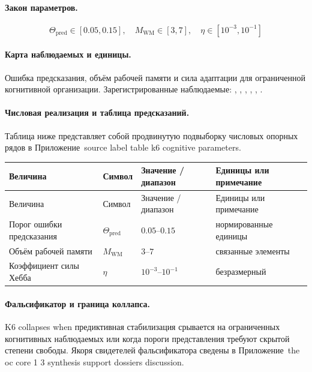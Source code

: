 \paragraph{Закон параметров.}
\[
\Theta_{\mathrm{pred}} \in [0.05,0.15],\quad M_{\mathrm{WM}} \in [3,7],\quad \eta \in [10^{-3},10^{-1}]
\]

\paragraph{Карта наблюдаемых и единицы.}
Ошибка предсказания, объём рабочей памяти и сила адаптации для ограниченной когнитивной организации.
Зарегистрированные наблюдаемые: , \allowbreak {}, \allowbreak {}, \allowbreak {}, \allowbreak {}, \allowbreak {}.

\paragraph{Числовая реализация и таблица предсказаний.}
Таблица ниже представляет собой продвинутую подвыборку числовых опорных рядов в Приложение~source label table k6 cognitive parameters.
\begin{longtable}{@{}L{0.27\textwidth}L{0.15\textwidth}L{0.24\textwidth}L{0.16\textwidth}@{}}
\toprule
Величина & Символ & Значение / диапазон & Единицы или примечание \\
\midrule
\endfirsthead
\toprule
Величина & Символ & Значение / диапазон & Единицы или примечание \\
\midrule
\endhead
Порог ошибки предсказания & $\scriptstyle \Theta_{\mathrm{pred}}$ & $0.05\text{--}0.15$ & нормированные единицы \\
Объём рабочей памяти & $\scriptstyle M_{\mathrm{WM}}$ & $3\text{--}7$ & связанные элементы \\
Коэффициент силы Хебба & $\scriptstyle \eta$ & $10^{-3}\text{--}10^{-1}$ & безразмерный \\
\bottomrule
\end{longtable}

\paragraph{Фальсификатор и граница коллапса.}
K6 collapses when предиктивная стабилизация срывается на ограниченных когнитивных наблюдаемых или когда пороги представления требуют скрытой степени свободы.
Якоря свидетелей фальсификатора сведены в Приложение~the oc core 1 3 synthesis support dossiers discussion.

